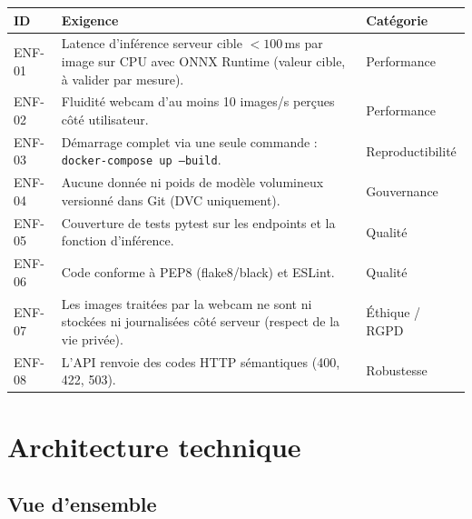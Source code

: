 \documentclass[11pt,a4paper]{article}
\begin{document}
\begin{longtable}{@{}p{1.3cm}p{9cm}p{2.2cm}@{}}
\toprule
\textbf{ID} & \textbf{Exigence} & \textbf{Catégorie} \\ \midrule
\endhead
ENF-01 & Latence d'inférence serveur cible $< 100$\,ms par image sur CPU avec ONNX Runtime (valeur cible, à valider par mesure). & Performance \\
ENF-02 & Fluidité webcam d'au moins 10 images/s perçues côté utilisateur. & Performance \\
ENF-03 & Démarrage complet via une seule commande : \texttt{docker-compose up --build}. & Reproductibilité \\
ENF-04 & Aucune donnée ni poids de modèle volumineux versionné dans Git (DVC uniquement). & Gouvernance \\
ENF-05 & Couverture de tests pytest sur les endpoints et la fonction d'inférence. & Qualité \\
ENF-06 & Code conforme à PEP8 (flake8/black) et ESLint. & Qualité \\
ENF-07 & Les images traitées par la webcam ne sont ni stockées ni journalisées côté serveur (respect de la vie privée). & Éthique / RGPD \\
ENF-08 & L'API renvoie des codes HTTP sémantiques (400, 422, 503). & Robustesse \\ \bottomrule
\end{longtable}

\section{Architecture technique}

\subsection{Vue d'ensemble}
\end{document}
